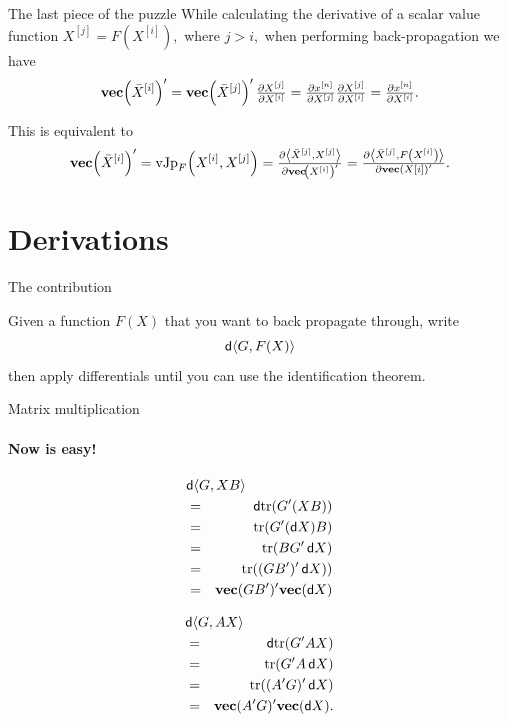 \documentclass[noamsthm]{beamer}
\begin{document}
\begin{frame}{The last piece of the puzzle}
While calculating the derivative of  a scalar value function \(X^{[j]} =
F\!\left(X^{[i]}\right),\) where \(j > i,\) when performing back-propagation we
have \[\mathbf{vec}\!\left(\bar X^{[i]}\right)' =
\mathbf{vec}\!\left(\bar X^{[j]}\right)' \textstyle\frac{\partial X^{[j]}}{\partial X^{[i]}} =
\textstyle\frac{\partial x^{[n]}}{\partial X^{[j]}} \textstyle\frac{\partial X^{[j]}}{\partial X^{[i]}} =
\textstyle\frac{\partial x^{[n]}}{\partial X^{[i]}}.\]

This is equivalent to
\[\mathbf{vec}\!\left(\bar X^{[i]}\right)'
= \mathrm{vJp}_F\!\left(X^{[i]},X^{[j]}\right)
= \textstyle\frac{\partial\left\langle\bar X^{[j]},X^{[j]}\right\rangle}{\partial\mathbf{vec}\!\left(X^{[i]}\right)'}
= \textstyle\frac{\partial\left\langle\bar X^{[j]},F\left(X^{[i]}\right)\right\rangle}{\partial\mathbf{vec}\left(X{[i]}\right)'}.\]
\end{frame}

\section{Derivations}

\begin{frame}{The contribution}

Given a function \(F(X)\) that you want to back propagate through, write
{\LARGE\[\mathop{}\!\mathsf d\langle G, F(X)\rangle\]}
then apply differentials until you can use the identification theorem.
\end{frame}

\begin{frame}{Matrix multiplication}
\framesubtitle{Now is easy!}
\begin{minipage}{.5\textwidth}
\begin{eqnarray*}
\lefteqn{\dif\langle G, X B \rangle} \\
&=& \dif\trace(G' (X B)) \\
&=& \trace(G' (\dif X) B) \\
&=& \trace(B G' \dif X) \\
&=& \trace((G B')' \dif X)) \\
&=& \vect(G B')' \vect(\dif X) \\
\end{eqnarray*}
\end{minipage}%
\begin{minipage}{.5\textwidth}
\begin{eqnarray*}
\lefteqn{\dif\langle G,A X\rangle} \\
&=& \dif\trace(G' A X) \\
&=& \trace(G' A \dif X) \\
&=& \trace((A' G)' \dif X) \\
&=& \vect(A' G)' \vect(\dif X). \\
&& \\
\end{eqnarray*}
\end{minipage}
\end{frame}
\end{document}
